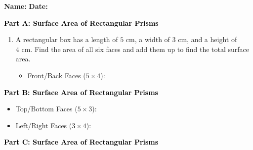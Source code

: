 \documentclass[12pt, letterpaper, fleqn]{article}
\newcommand{\blanklong}{\underline{\hspace{6.5cm}}}
\begin{document}
\textbf{Name:} \underline{\hspace{5cm}}
\hfill
\textbf{Date:} \underline{\hspace{3cm}}\\

\begin{tcolorbox}[colback=customteal!20]
\large\textcolor{black}{\textbf{Part A: Surface Area of Rectangular Prisms}}
\end{tcolorbox}

\vspace{3mm}

\begin{enumerate}[itemsep=4.2cm, leftmargin=0.6cm]
\item A rectangular box has a length of $5\text{ cm}$, a width of $3\text{ cm}$, and a height of $4\text{ cm}$. Find the area of all six faces and add them up to find the total surface area.
\begin{itemize}
\item Front/Back Faces ($5 \times 4$): \blanklong
\end{itemize}
\end{enumerate}

\newpage

\begin{tcolorbox}[colback=customteal!20]
\large\textcolor{black}{\textbf{Part B: Surface Area of Rectangular Prisms}}
\end{tcolorbox}

\vspace{3mm}

\begin{enumerate}[itemsep=4.2cm, leftmargin=0.6cm, resume]
\begin{itemize}
\item Top/Bottom Faces ($5 \times 3$): \blanklong
\item Left/Right Faces ($3 \times 4$): \blanklong
\end{itemize}
\end{enumerate}

\newpage

\begin{tcolorbox}[colback=customteal!20]
\large\textcolor{black}{\textbf{Part C: Surface Area of Rectangular Prisms}}
\end{tcolorbox}
\end{document}
